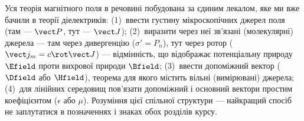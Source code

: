 \begin{Attention}
	Уся теорія магнітного поля в речовині побудована за єдиним лекалом, яке ми вже бачили в теорії діелектриків: (1)~ввести густину
	мікроскопічних джерел поля (там --- $\vect P$, тут --- $\vect J$); (2)~виразити через неї зв'язані (молекулярні) джерела --- там через
	дивергенцію ($\sigma' = P_n$), тут через ротор ($\vect j_m = c\rot\vect J$) --- відмінність, що відображає потенціальну природу $\Efield$
	проти вихрової природи $\Bfield$; (3)~ввести допоміжний вектор ($\Dfield$ або $\Hfield$), теорема для якого містить  вільні
	(вимірювані) джерела; (4)~для лінійних середовищ пов'язати допоміжний і основний вектори простим коефіцієнтом ($\epsilon$ або $\mu$). Розуміння
	цієї спільної структури --- найкращий спосіб не заплутатися в позначеннях і знаках обох розділів курсу.
\end{Attention}
